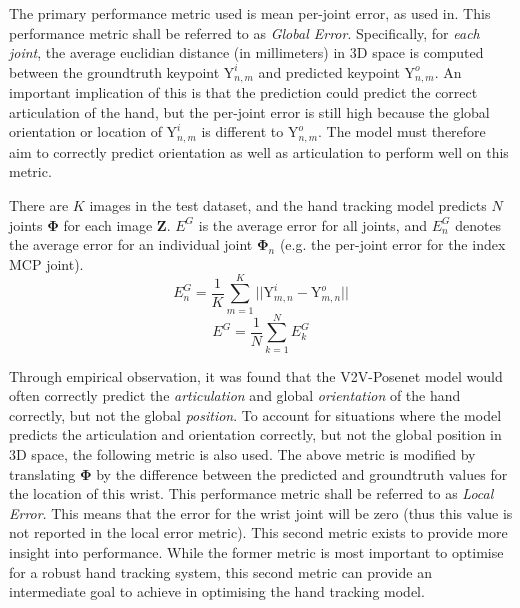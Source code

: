 The primary performance metric used is mean per-joint error, as used in\cite{sun2015cascaded}. This performance metric shall be referred to as {\slshape Global Error}. Specifically, for {\slshape each joint}, the average euclidian distance (in millimeters) in 3D space is computed between the groundtruth keypoint $\bm{\mathrm{Y}}^{i}_{n,m}$ and predicted keypoint $\bm{\mathrm{Y}}^{o}_{n,m}$. An important implication of this is that the prediction could predict the correct articulation of the hand, but the per-joint error is still high because the global orientation or location of $\bm{\mathrm{Y}}^{i}_{n,m}$ is different to $\bm{\mathrm{Y}}^{o}_{n,m}$. The model must therefore aim to correctly predict orientation as well as articulation to perform well on this metric.


There are $K$ images in the test dataset, and the hand tracking model predicts $N$ joints $\bm{\Phi}$ for each image $\bm{Z}$. $E^G$ is the average error for all joints, and $E^{G}_{n}$ denotes the average error for an individual joint $\bm{\Phi}_n$ (e.g. the per-joint error for the index MCP joint).
\begin{equation}
E^{G}_{n} = \frac{1}{K}\sum_{m=1}^{K} ||\bm{\mathrm{Y}}^{i}_{m,n} - \bm{\mathrm{Y}}^{o}_{m,n}||
\end{equation}
\begin{equation}
    E^{G} = \frac{1}{N}\sum_{k=1}^{N} E^{G}_{k}
\end{equation}

Through empirical observation, it was found that the V2V-Posenet model would often correctly predict the {\slshape articulation} and global {\slshape orientation} of the hand correctly, but not the global {\slshape position}. To account for situations where the model predicts the articulation and orientation correctly, but not the global position in 3D space, the following metric is also used. The above metric is modified by translating $\bm{\Phi}$ by the difference between the predicted and groundtruth values for the location of this wrist. This performance metric shall be referred to as {\slshape Local Error}. This means that the error for the wrist joint will be zero (thus this value is not reported in the local error metric). This second metric exists to provide more insight into performance. While the former metric is most important to optimise for a robust hand tracking system, this second metric can provide an intermediate goal to achieve in optimising the hand tracking model.

